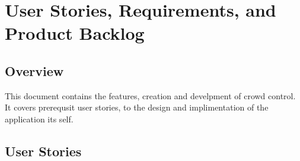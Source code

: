
\chapter{User Stories,  Requirements, and Product Backlog}
\section{Overview}

This document contains the features, creation and develpment of crowd control. It covers prerequsit user stories, to the design and implimentation of the application its self.







\section{User Stories}




